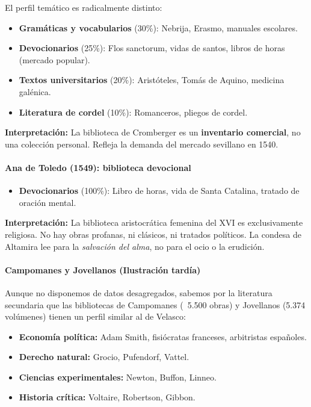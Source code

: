 \documentclass[12pt,a4paper]{article}
\begin{document}
El perfil temático es radicalmente distinto:

\begin{itemize}
\item \textbf{Gramáticas y vocabularios} (30\%): Nebrija, Erasmo, manuales escolares.
\item \textbf{Devocionarios} (25\%): Flos sanctorum, vidas de santos, libros de horas (mercado popular).
\item \textbf{Textos universitarios} (20\%): Aristóteles, Tomás de Aquino, medicina galénica.
\item \textbf{Literatura de cordel} (10\%): Romanceros, pliegos de cordel.
\end{itemize}

\textbf{Interpretación:} La biblioteca de Cromberger es un \textbf{inventario comercial}, no una colección personal. Refleja la demanda del mercado sevillano en 1540.

\paragraph{Ana de Toledo (1549): biblioteca devocional}

\begin{itemize}
\item \textbf{Devocionarios} (100\%): Libro de horas, vida de Santa Catalina, tratado de oración mental.
\end{itemize}

\textbf{Interpretación:} La biblioteca aristocrática femenina del XVI es exclusivamente religiosa. No hay obras profanas, ni clásicos, ni tratados políticos. La condesa de Altamira lee para la \textit{salvación del alma}, no para el ocio o la erudición.

\paragraph{Campomanes y Jovellanos (Ilustración tardía)}

Aunque no disponemos de datos desagregados, sabemos por la literatura secundaria que las bibliotecas de Campomanes (~5.500 obras) y Jovellanos (5.374 volúmenes) tienen un perfil similar al de Velasco:

\begin{itemize}
\item \textbf{Economía política:} Adam Smith, fisiócratas franceses, arbitristas españoles.
\item \textbf{Derecho natural:} Grocio, Pufendorf, Vattel.
\item \textbf{Ciencias experimentales:} Newton, Buffon, Linneo.
\item \textbf{Historia crítica:} Voltaire, Robertson, Gibbon.
\end{itemize}
\end{document}
